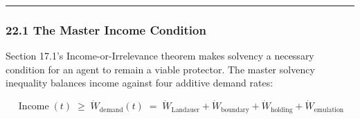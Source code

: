\documentclass[
]{article}
\begin{document}
\begin{center}\rule{0.5\linewidth}{0.5pt}\end{center}

\subsubsection{22.1 The Master Income
Condition}\label{the-master-income-condition}

Section 17.1's Income-or-Irrelevance theorem makes solvency a necessary
condition for an agent to remain a viable protector. The master solvency
inequality balances income against four additive demand rates:

\[\boxed{\operatorname{Income}(t) \;\ge\; \dot W_{\mathrm{demand}}(t) \;=\; \dot W_{\mathrm{Landauer}} + \dot W_{\mathrm{boundary}} + \dot W_{\mathrm{holding}} + \dot W_{\mathrm{emulation}}}\]
\end{document}
